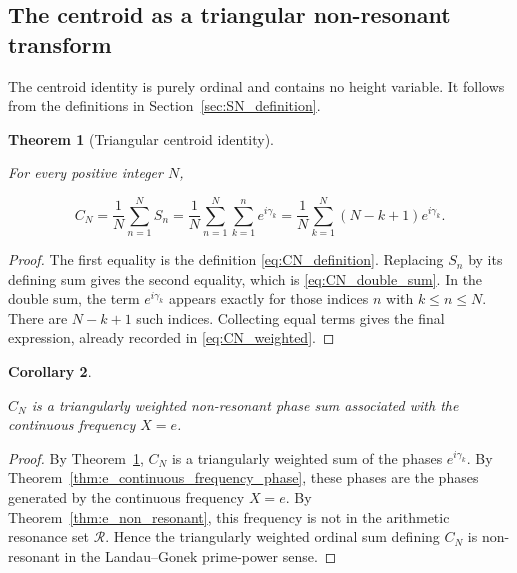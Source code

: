 \documentclass[11pt]{amsart}
\numberwithin{equation}{section}
\theoremstyle{plain}
\newtheorem{theorem}{Theorem}[section]
\newtheorem{corollary}[theorem]{Corollary}
\theoremstyle{definition}
\theoremstyle{remark}
\begin{document}
\subsection{The centroid as a triangular non-resonant transform}
\label{subsec:centroid_triangular_non_resonant_transform}

The centroid identity is purely ordinal and contains no height variable.
It follows from the definitions in Section~\ref{sec:SN_definition}.

\begin{theorem}[Triangular centroid identity]
\label{thm:triangular_centroid_identity}

For every positive integer \(N\),

\begin{equation}
C_N
=
\frac{1}{N}\sum_{n=1}^{N}S_n
=
\frac{1}{N}\sum_{n=1}^{N}\sum_{k=1}^{n}e^{i\gamma_k}
=
\frac{1}{N}\sum_{k=1}^{N}(N-k+1)e^{i\gamma_k}.
\label{eq:triangular_centroid_identity}
\end{equation}

\end{theorem}

\begin{proof}
The first equality is the definition \eqref{eq:CN_definition}. Replacing
\(S_n\) by its defining sum gives the second equality, which is
\eqref{eq:CN_double_sum}. In the double sum, the term
\(e^{i\gamma_k}\) appears exactly for those indices \(n\) with
\(k\leq n\leq N\). There are \(N-k+1\) such indices. Collecting equal
terms gives the final expression, already recorded in
\eqref{eq:CN_weighted}.
\end{proof}

\begin{corollary}
\label{cor:centroid_triangular_non_resonant_phase_sum}

\(C_N\) is a triangularly weighted non-resonant phase sum associated with
the continuous frequency \(X=e\).

\end{corollary}

\begin{proof}
By Theorem~\ref{thm:triangular_centroid_identity}, \(C_N\) is a
triangularly weighted sum of the phases \(e^{i\gamma_k}\). By
Theorem~\ref{thm:e_continuous_frequency_phase}, these phases are the
phases generated by the continuous frequency \(X=e\). By
Theorem~\ref{thm:e_non_resonant}, this frequency is not in the
arithmetic resonance set \(\mathcal R\). Hence the triangularly weighted
ordinal sum defining \(C_N\) is non-resonant in the Landau--Gonek
prime-power sense.
\end{proof}
\end{document}
